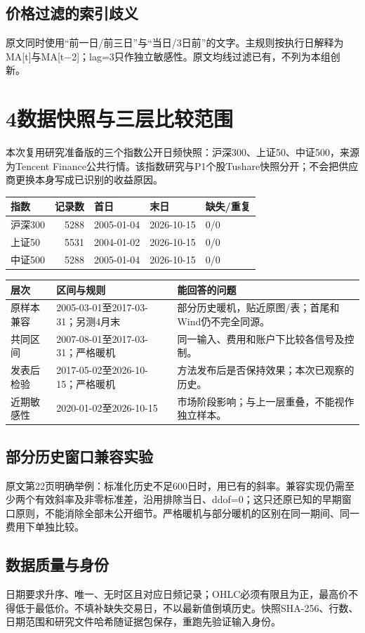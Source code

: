 \documentclass[UTF8,a4paper,10pt]{ctexart}
\newcommand{\lead}[1]{\par\noindent{\bfseries\color{accent}#1}\par}
\newcommand{\page}[1]{\newpage\section*{#1}}
\begin{document}
\subsection*{价格过滤的索引歧义}
原文同时使用“前一日/前三日”与“当日/3日前”的文字。主规则按执行日解释为MA[t]与MA[t−2]；lag=3只作独立敏感性。原文均线过滤已有，不列为本组创新。

\page{4\quad 数据快照与三层比较范围}
\lead{先确定什么可以比较，再解释收益差异。}
本次复用研究准备版的三个指数公开日频快照：沪深300、上证50、中证500，来源为Tencent Finance公共行情。该指数研究与P1个股Tushare快照分开；不会把供应商更换本身写成已识别的收益原因。

\begin{center}\scriptsize\begin{tabularx}{\textwidth}{Xrlll}\toprule
指数 & 记录数 & 首日 & 末日 & 缺失/重复\\\midrule
沪深300 & 5288 & 2005-01-04 & 2026-10-15 & 0/0\\
上证50 & 5531 & 2004-01-02 & 2026-10-15 & 0/0\\
中证500 & 5288 & 2005-01-04 & 2026-10-15 & 0/0\\
\bottomrule\end{tabularx}\end{center}
\begin{center}\small\begin{tabularx}{\textwidth}{lXX}\toprule
层次 & 区间与规则 & 能回答的问题\\\midrule
原样本兼容 & 2005-03-01至2017-03-31；另测4月末 & 部分历史暖机，贴近原图/表；首尾和Wind仍不完全同源。\\
共同区间 & 2007-08-01至2017-03-31；严格暖机 & 同一输入、费用和账户下比较各信号及控制。\\
发表后检验 & 2017-05-02至2026-10-15；严格暖机 & 方法发布后是否保持效果；本次已观察的历史。\\
近期敏感性 & 2020-01-02至2026-10-15 & 市场阶段影响；与上一层重叠，不能视作独立样本。\\
\bottomrule\end{tabularx}\end{center}
\subsection*{部分历史窗口兼容实验}
原文第22页明确举例：标准化历史不足600日时，用已有的斜率。兼容实现仍需至少两个有效斜率及非零标准差，沿用排除当日、ddof=0；这只还原已知的早期窗口原则，不能消除全部未公开细节。严格暖机与部分暖机的区别在同一期间、同一费用下单独比较。
\subsection*{数据质量与身份}
日期要求升序、唯一、无时区且对应日频记录；OHLC必须有限且为正，最高价不得低于最低价。不填补缺失交易日，不以最新值倒填历史。快照SHA-256、行数、日期范围和研究文件哈希随证据包保存，重跑先验证输入身份。
\end{document}
